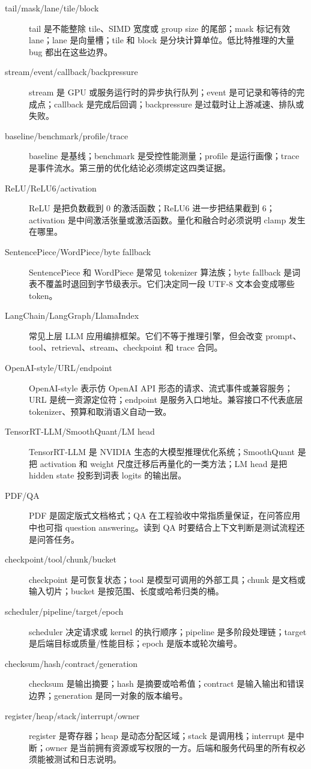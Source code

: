 \begin{description}
  \item[tail/mask/lane/tile/block] tail 是不能整除 tile、SIMD 宽度或 group size 的尾部；mask 标记有效 lane；lane 是向量槽；tile 和 block 是分块计算单位。低比特推理的大量 bug 都出在这些边界。
  \item[stream/event/callback/backpressure] stream 是 GPU 或服务运行时的异步执行队列；event 是可记录和等待的完成点；callback 是完成后回调；backpressure 是过载时让上游减速、排队或失败。
  \item[baseline/benchmark/profile/trace] baseline 是基线；benchmark 是受控性能测量；profile 是运行画像；trace 是事件流水。第三册的优化结论必须绑定这四类证据。
  \item[ReLU/ReLU6/activation] ReLU 是把负数截到 0 的激活函数；ReLU6 进一步把结果截到 6；activation 是中间激活张量或激活函数。量化和融合时必须说明 clamp 发生在哪里。
  \item[SentencePiece/WordPiece/byte fallback] SentencePiece 和 WordPiece 是常见 tokenizer 算法族；byte fallback 是词表不覆盖时退回到字节级表示。它们决定同一段 UTF-8 文本会变成哪些 token。
  \item[LangChain/LangGraph/LlamaIndex] 常见上层 LLM 应用编排框架。它们不等于推理引擎，但会改变 prompt、tool、retrieval、stream、checkpoint 和 trace 合同。
  \item[OpenAI-style/URL/endpoint] OpenAI-style 表示仿 OpenAI API 形态的请求、流式事件或兼容服务；URL 是统一资源定位符；endpoint 是服务入口地址。兼容接口不代表底层 tokenizer、预算和取消语义自动一致。
  \item[TensorRT-LLM/SmoothQuant/LM head] TensorRT-LLM 是 NVIDIA 生态的大模型推理优化系统；SmoothQuant 是把 activation 和 weight 尺度迁移后再量化的一类方法；LM head 是把 hidden state 投影到词表 logits 的输出层。
  \item[PDF/QA] PDF 是固定版式文档格式；QA 在工程验收中常指质量保证，在问答应用中也可指 question answering。读到 QA 时要结合上下文判断是测试流程还是问答任务。
  \item[checkpoint/tool/chunk/bucket] checkpoint 是可恢复状态；tool 是模型可调用的外部工具；chunk 是文档或输入切片；bucket 是按范围、长度或哈希归类的桶。
  \item[scheduler/pipeline/target/epoch] scheduler 决定请求或 kernel 的执行顺序；pipeline 是多阶段处理链；target 是后端目标或质量/性能目标；epoch 是版本或轮次编号。
  \item[checksum/hash/contract/generation] checksum 是输出摘要；hash 是摘要或哈希值；contract 是输入输出和错误边界；generation 是同一对象的版本编号。
  \item[register/heap/stack/interrupt/owner] register 是寄存器；heap 是动态分配区域；stack 是调用栈；interrupt 是中断；owner 是当前拥有资源或写权限的一方。后端和服务代码里的所有权必须能被测试和日志说明。

\end{description}
